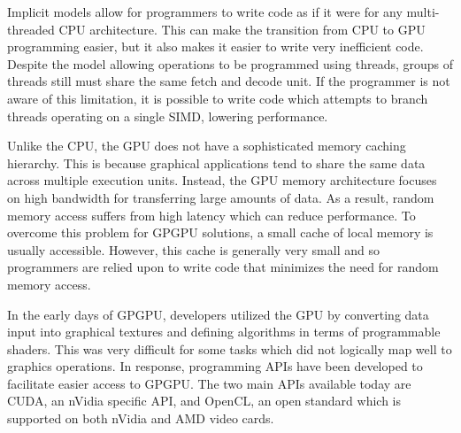 Implicit models allow for programmers to write code as if it were for any multi-threaded CPU architecture. This can make the transition from CPU to GPU programming easier, but it also makes it easier to write very inefficient code. Despite the model allowing operations to be programmed using threads, groups of threads still must share the same fetch and decode unit. If the programmer is not aware of this limitation, it is possible to write code which attempts to branch threads operating on a single SIMD, lowering performance.

Unlike the CPU, the GPU does not have a sophisticated memory caching hierarchy. This is because graphical applications tend to share the same data across multiple execution units. Instead, the GPU memory architecture focuses on high bandwidth for transferring large amounts of data. As a result, random memory access suffers from high latency which can reduce performance. To overcome this problem for GPGPU solutions, a small cache of local memory is usually accessible. However, this cache is generally very small and so programmers are relied upon to write code that minimizes the need for random memory access.

In the early days of GPGPU, developers utilized the GPU by converting data input into graphical textures and defining algorithms in terms of programmable shaders. This was very difficult for some tasks which did not logically map well to graphics operations. In response, programming APIs have been developed to facilitate easier access to GPGPU. The two main APIs available today are CUDA, an nVidia specific API, and OpenCL, an open standard which is supported on both nVidia and AMD video cards.
